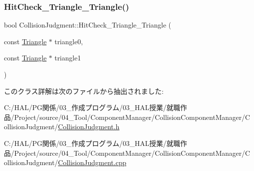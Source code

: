 \mbox{\label{class_collision_judgment_ab33b8936e62bdb9b6cf6f3d383c033b9}} 
\subsubsection{\texorpdfstring{Hit\+Check\+\_\+\+Triangle\+\_\+\+Triangle()}{HitCheck\_Triangle\_Triangle()}}
{\footnotesize\ttfamily bool Collision\+Judgment\+::\+Hit\+Check\+\_\+\+Triangle\+\_\+\+Triangle (\begin{DoxyParamCaption}\item[{const \mbox{\hyperlink{class_triangle}{Triangle}} $\ast$}]{triangle0,  }\item[{const \mbox{\hyperlink{class_triangle}{Triangle}} $\ast$}]{triangle1 }\end{DoxyParamCaption})\hspace{0.3cm}{\ttfamily [static]}}



このクラス詳解は次のファイルから抽出されました\+:\begin{DoxyCompactItemize}
\item 
C\+:/\+H\+A\+L/\+P\+G関係/03\+\_\+作成プログラム/03\+\_\+\+H\+A\+L授業/就職作品/\+Project/source/04\+\_\+\+Tool/\+Component\+Manager/\+Collision\+Component\+Manager/\+Collision\+Judgment/\mbox{\hyperlink{_collision_judgment_8h}{Collision\+Judgment.\+h}}\item 
C\+:/\+H\+A\+L/\+P\+G関係/03\+\_\+作成プログラム/03\+\_\+\+H\+A\+L授業/就職作品/\+Project/source/04\+\_\+\+Tool/\+Component\+Manager/\+Collision\+Component\+Manager/\+Collision\+Judgment/\mbox{\hyperlink{_collision_judgment_8cpp}{Collision\+Judgment.\+cpp}}\end{DoxyCompactItemize}
